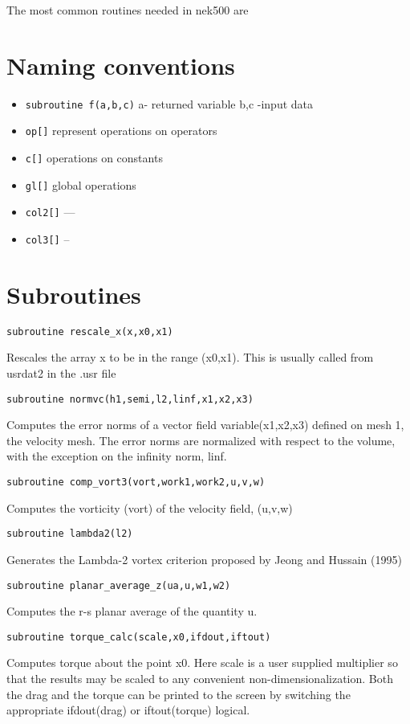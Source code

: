 The most common routines needed in nek500 are
\section{Naming conventions}
\begin{itemize}
\item  {\tt{subroutine f(a,b,c)}}
a- returned variable
b,c -input data
\item {\tt{op}[]} represent operations on operators
\item {\tt{c}[]}  operations on constants
\item {\tt{gl}[]} global operations
\item {\tt{col2}[]} ---
\item {\tt{col3}[]} --
\end{itemize}

\section{Subroutines}
{\tt subroutine rescale\_x(x,x0,x1)}

    Rescales the array x to be in the range (x0,x1). This is usually called from usrdat2 in the .usr file 
    
{\tt subroutine normvc(h1,semi,l2,linf,x1,x2,x3)}

    Computes the error norms of a vector field variable(x1,x2,x3) defined on mesh 1, the velocity mesh. The error norms are normalized with respect to the volume, with the exception on the infinity norm, linf. 
    
{\tt subroutine comp\_vort3(vort,work1,work2,u,v,w)}

    Computes the vorticity (vort) of the velocity field, (u,v,w) 
    
{\tt subroutine lambda2(l2)}

    Generates the Lambda-2 vortex criterion proposed by Jeong and Hussain (1995) 
    
{\tt subroutine planar\_average\_z(ua,u,w1,w2)}

    Computes the r-s planar average of the quantity u. 
    
{\tt subroutine torque\_calc(scale,x0,ifdout,iftout)}

    Computes torque about the point x0. Here scale is a user supplied multiplier so that the results may be scaled to any convenient non-dimensionalization. Both the drag and the torque can be printed to the screen by switching the appropriate ifdout(drag) or iftout(torque) logical. 
    
